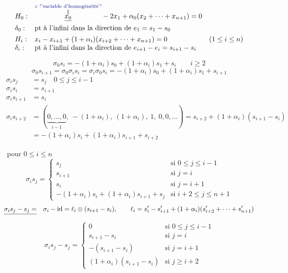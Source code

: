 \documentclass[11pt,a4paper]{article}
\begin{document}
\[
\begin{array}{lll}
H_0 : & \overset{\substack{z\ \add{\text{variable d'homogénéité}}\\ \|}}{\struck{x_0}} - 2x_1 + \alpha_0(x_2 + \cdots + x_{n+1}) = 0 &\\
\delta_0 : & \text{pt à l'infini dans la direction de } e_1 = s_1 - s_0 &\\[4pt]
H_i : & x_i - x_{i+1} + (1+\alpha_i)(x_{i+2} + \cdots + x_{n+1}) = 0 & (1\le i\le n)\\
\delta_i : & \text{pt à l'infini dans la direction de } e_{i+1} - e_i = s_{i+1} - s_i &
\end{array}
\]

\[
\sigma_0 s_i = -(1+\alpha_i)s_0 + (1+\alpha_i)s_1 + s_i \qquad i\ge 2
\]
\[
\sigma_0 s_{i+1} = \sigma_0\sigma_i s_i = \sigma_i\sigma_0 s_i = -(1+\alpha_i)s_0 + (1+\alpha_i)s_1 + s_{i+1}
\]
\[
\begin{aligned}
\sigma_i s_j &= s_j \quad 0\le j\le i-1\\
\sigma_i s_i &= s_{i+1}\\
\sigma_i s_{i+1} &= s_i\\
\sigma_i s_{i+2} &= (\underbrace{0, \dots, 0}_{i-1},\ -(1+\alpha_i),\ (1+\alpha_i),\ 1,\ 0, 0, \dots) = s_{i+2} + (1+\alpha_i)(s_{i+1} - s_i)\\
&= -(1+\alpha_i)s_i + (1+\alpha_i)s_{i+1} + s_{i+2}
\end{aligned}
\]

 \quad \struck{\ill{}}\ pour $0\le i\le n$
\[
\boxed{\sigma_i s_j = \begin{cases}
s_j & \text{si } 0\le j\le i-1\\
s_{i+1} & \text{si } j = i\\
s_i & \text{si } j = i+1\\
-(1+\alpha_i)s_i + (1+\alpha_i)s_{i+1} + s_j & \text{si } i+2\le j\le n+1
\end{cases}}
\]
\[
\struck{\sigma_i s_j - s_j =} \quad \sigma_i - \mathrm{id} = \ell_i \otimes (s_{i+1} - s_i), \qquad \ell_i = s'_i - s'_{i+1} + (1+\alpha_i)(s'_{i+2} + \cdots + s'_{n+1})
\]
\[
\sigma_i s_j - s_j = \begin{cases}
0 & \text{si } 0\le j\le i-1\\
s_{i+1} - s_i & \text{si } j = i\\
-(s_{i+1} - s_i) & \text{si } j = i+1\\
(1+\alpha_i)(s_{i+1} - s_i) & \text{si } j\ge i+2
\end{cases}
\]
\end{document}
